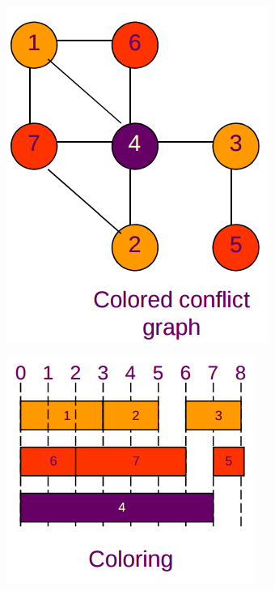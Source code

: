 \begin{figure}[H]
\begin{subfigure}[b]{0.2\textwidth}
		\includegraphics[width=\textwidth]{./Cap5/Images/Image13.png}
		\caption{}
		\label{fig:coloredConflict}
	\end{subfigure}
	\begin{subfigure}[b]{0.2\textwidth}
		\includegraphics[width=\textwidth]{./Cap5/Images/Image14.png}
		\caption{}
		\label{fig:coloring}
	\end{subfigure}
	\caption{}
\end{figure}
